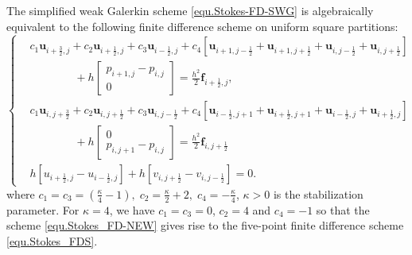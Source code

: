 \documentclass[final,leqno]{siamltex704}
\def\bu{\bm{u}}
\def\bbf{\bm{f}}
\begin{document}
\begin{theorem}\label{DF-equi-SWG-new}
The simplified weak Galerkin scheme \eqref{equ.Stokes-FD-SWG} is algebraically equivalent to the following finite difference scheme on uniform square partitions:
\begin{equation}\label{equ.Stokes_FD-NEW}
\left\{
\begin{split}
&{c_1 \bu_{i+\frac{3}{2},j} + c_2 \bu_{i+\frac{1}{2},j} + c_3 \bu_{i-\frac{1}{2},j} + c_4[\bu_{i+1,j-\frac{1}{2}} + \bu_{i+1,j+\frac{1}{2}} + \bu_{i,j-\frac{1}{2}}+ \bu_{i,j+\frac{1}{2}}]} \\
& \qquad \qquad  +
h\begin{bmatrix}
  {p_{i+1,j}-p_{i,j}} \\
  0
\end{bmatrix}
=\frac{h^2}{2}\bbf_{i+\frac{1}{2},j},\\
&
{c_1 \bu_{i,j+\frac{3}{2}} + c_2\bu_{i,j+\frac{1}{2}} + c_3\bu_{i,j-\frac{1}{2}} + c_4[\bu_{i-\frac{1}{2},j+1} + \bu_{i+\frac{1}{2},j+1} +\bu_{i-\frac{1}{2},j}+\bu_{i+\frac{1}{2},j}]}\\
& \qquad \qquad  + h
\begin{bmatrix}
  0 \\
  {p_{i,j+1}-p_{i,j}}
\end{bmatrix}
=\frac{h^2}{2}\bbf_{i,j+\frac{1}{2}}\\
&h[u_{i+\frac{1}{2},j} - u_{i-\frac{1}{2},j}] + h[v_{i,j+\frac{1}{2}} - v_{i,j-\frac{1}{2}}]=0.
\end{split}
\right.
\end{equation}
where
$ c_1=c_3=\displaystyle(\frac{\kappa}{4}-1),\; c_2=\displaystyle\frac{\kappa}{2}+2,\; c_4=\displaystyle-\frac{\kappa}{4}$, $\kappa>0$ is the stabilization parameter. For $\kappa=4$, we have $c_1=c_3=0$, $c_2=4$ and $c_4=-1$ so that the scheme \eqref{equ.Stokes_FD-NEW} gives rise to the five-point finite difference scheme \eqref{equ.Stokes_FDS}.
\end{theorem}
\end{document}
